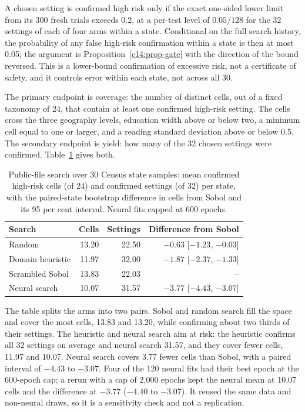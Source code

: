 A chosen setting is confirmed high risk only if the exact one-sided lower limit from
its 300 fresh trials exceeds 0.2, at a per-test level of $0.05/128$ for the 32
settings of each of four arms within a state. Conditional on the full search history,
the probability of any false high-risk confirmation within a state is then at most
0.05; the argument is Proposition~\ref{c14:prop-gate} with the direction of the bound
reversed. This is a lower-bound confirmation of excessive risk, not a certificate of
safety, and it controls error within each state, not across all 30.

The primary endpoint is coverage: the number of distinct cells, out of a fixed
taxonomy of 24, that contain at least one confirmed high-risk setting. The cells cross
the three geography levels, education width above or below two, a minimum cell equal
to one or larger, and a reading standard deviation above or below 0.5. The secondary
endpoint is yield: how many of the 32 chosen settings were confirmed.
Table~\ref{c14:tab-public} gives both.

\begin{table}[ht]
\centering
\caption{Public-file search over 30 Census state samples: mean confirmed high-risk
cells (of 24) and confirmed settings (of 32) per state, with the paired-state bootstrap
difference in cells from Sobol and its 95 per cent interval. Neural fits capped at 600
epochs.}
\label{c14:tab-public}
\small
\begin{tabular}{lrrr}
\toprule
Search & Cells & Settings & Difference from Sobol \\
\midrule
Random           & 13.20 & 22.50 & $-0.63$ [$-1.23$, $-0.03$] \\
Domain heuristic & 11.97 & 32.00 & $-1.87$ [$-2.37$, $-1.33$] \\
Scrambled Sobol  & 13.83 & 22.03 & -- \\
Neural search    & 10.07 & 31.57 & $-3.77$ [$-4.43$, $-3.07$] \\
\bottomrule
\end{tabular}
\end{table}

The table splits the arms into two pairs. Sobol and random search fill the space and
cover the most cells, 13.83 and 13.20, while confirming about two thirds of their
settings. The heuristic and neural search aim at risk: the heuristic confirms all 32
settings on average and neural search 31.57, and they cover fewer cells, 11.97 and
10.07. Neural search covers 3.77 fewer cells than Sobol, with a paired interval of
$-4.43$ to $-3.07$. Four of the 120 neural fits had their best epoch at the 600-epoch
cap; a rerun with a cap of 2{,}000 epochs kept the neural mean at 10.07 cells and the
difference at $-3.77$ ($-4.40$ to $-3.07$). It reused the same data and non-neural
draws, so it is a sensitivity check and not a replication.

